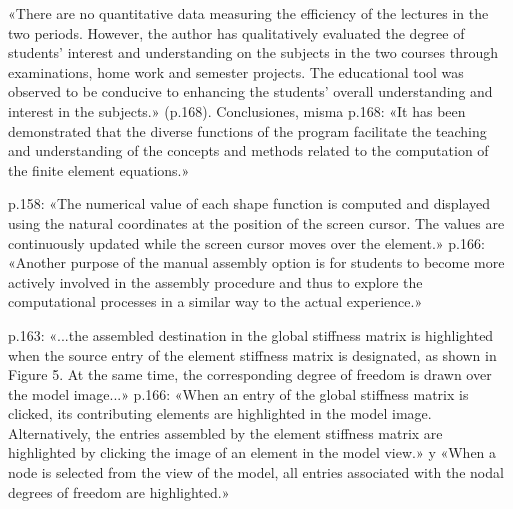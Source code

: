 \documentclass[11pt,a4paper]{article}
\newcommand{\campo}[1]{\textcolor{gris}{\footnotesize #1}}
\begin{document}
\begin{pasaje}\footnotesize «There are no quantitative data measuring the efficiency of the lectures in the two periods. However, the author has qualitatively evaluated the degree of students' interest and understanding on the subjects in the two courses through examinations, home work and semester projects. The educational tool was observed to be conducive to enhancing the students' overall understanding and interest in the subjects.» (p.168). Conclusiones, misma p.168: «It has been demonstrated that the diverse functions of the program facilitate the teaching and understanding of the concepts and methods related to the computation of the finite element equations.»\end{pasaje}
\vspace{3pt}\noindent{\small\textbf{p.\ 158 y 166} \quad \campo{«El diseño de estos módulos parte de la evidencia sobre la interactividad como motor del aprendizaje en ingeniería» --- tesis/capitulos/03\_diseno\_implementacion.tex:155}}\par
\begin{pasaje}\footnotesize p.158: «The numerical value of each shape function is computed and displayed using the natural coordinates at the position of the screen cursor. The values are continuously updated while the screen cursor moves over the element.» p.166: «Another purpose of the manual assembly option is for students to become more actively involved in the assembly procedure and thus to explore the computational processes in a similar way to the actual experience.»\end{pasaje}
\vspace{3pt}\noindent{\small\textbf{p.\ 163 y 166} \quad \campo{«Cada módulo es una capa superpuesta interactiva que ilumina sobre la malla real el punto donde ocurre el cálculo, evitando la abstracción de una ventana desconectada del modelo» --- tesis/capitulos/04\_resultados.tex:207}}\par
\begin{pasaje}\footnotesize p.163: «...the assembled destination in the global stiffness matrix is highlighted when the source entry of the element stiffness matrix is designated, as shown in Figure 5. At the same time, the corresponding degree of freedom is drawn over the model image...» p.166: «When an entry of the global stiffness matrix is clicked, its contributing elements are highlighted in the model image. Alternatively, the entries assembled by the element stiffness matrix are highlighted by clicking the image of an element in the model view.» y «When a node is selected from the view of the model, all entries associated with the nodal degrees of freedom are highlighted.»\end{pasaje}
\end{document}
